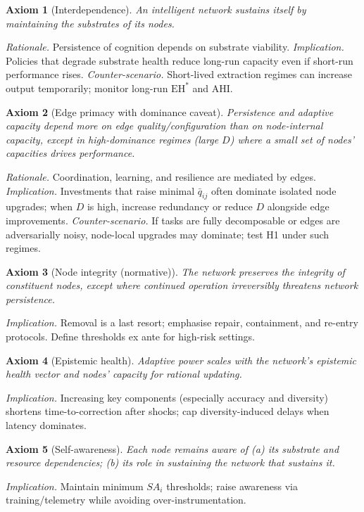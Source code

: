\documentclass[12pt]{article}
\newcommand{\EH}{\ensuremath{\mathrm{EH}}}
\newcommand{\AHI}{\ensuremath{\mathrm{AHI}}}
\newtheorem{axiom}{Axiom}
\begin{document}
\begin{axiom}[Interdependence]
An intelligent network sustains itself by maintaining the substrates of its nodes.
\end{axiom}
\emph{Rationale.} Persistence of cognition depends on substrate viability. \emph{Implication.} Policies that degrade substrate health reduce long-run capacity even if short-run performance rises. \emph{Counter-scenario.} Short-lived extraction regimes can increase output temporarily; monitor long-run $\EH^{\ast}$ and \AHI.

\begin{axiom}[Edge primacy with dominance caveat]
Persistence and adaptive capacity depend more on edge quality/configuration than on node-internal capacity, \emph{except} in high-dominance regimes (large $D$) where a small set of nodes’ capacities drives performance.
\end{axiom}
\emph{Rationale.} Coordination, learning, and resilience are mediated by edges. \emph{Implication.} Investments that raise minimal $\bar q_{ij}$ often dominate isolated node upgrades; when $D$ is high, increase redundancy or reduce $D$ alongside edge improvements. \emph{Counter-scenario.} If tasks are fully decomposable or edges are adversarially noisy, node-local upgrades may dominate; test H1 under such regimes.

\begin{axiom}[Node integrity (normative)]
The network preserves the integrity of constituent nodes, except where continued operation irreversibly threatens network persistence.
\end{axiom}
\emph{Implication.} Removal is a last resort; emphasise repair, containment, and re-entry protocols. Define thresholds ex ante for high-risk settings.

\begin{axiom}[Epistemic health]
Adaptive power scales with the network’s epistemic health vector and nodes’ capacity for rational updating.
\end{axiom}
\emph{Implication.} Increasing key components (especially accuracy and diversity) shortens time-to-correction after shocks; cap diversity-induced delays when latency dominates.

\begin{axiom}[Self-awareness]
Each node remains aware of (a) its substrate and resource dependencies; (b) its role in sustaining the network that sustains it.
\end{axiom}
\emph{Implication.} Maintain minimum $SA_i$ thresholds; raise awareness via training/telemetry while avoiding over-instrumentation.
\end{document}

